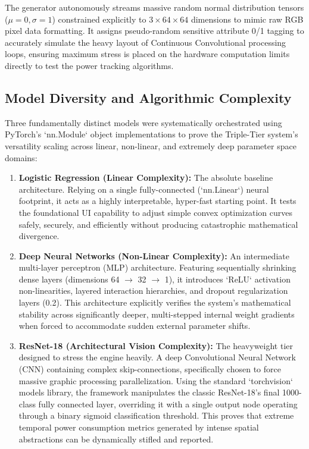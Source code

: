 \documentclass[12pt,a4paper]{article}
\begin{document}
The generator autonomously streams massive random normal distribution tensors ($\mu=0, \sigma=1$) constrained explicitly to $3 \times 64 \times 64$ dimensions to mimic raw RGB pixel data formatting. It assigns pseudo-random sensitive attribute 0/1 tagging to accurately simulate the heavy layout of Continuous Convolutional processing loops, ensuring maximum stress is placed on the hardware computation limits directly to test the power tracking algorithms.

\subsection{Model Diversity and Algorithmic Complexity}
Three fundamentally distinct models were systematically orchestrated using PyTorch's `nn.Module` object implementations to prove the Triple-Tier system’s versatility scaling across linear, non-linear, and extremely deep parameter space domains:
\begin{enumerate}
    \item \textbf{Logistic Regression (Linear Complexity):} The absolute baseline architecture. Relying on a single fully-connected (`nn.Linear`) neural footprint, it acts as a highly interpretable, hyper-fast starting point. It tests the foundational UI capability to adjust simple convex optimization curves safely, securely, and efficiently without producing catastrophic mathematical divergence.
    \item \textbf{Deep Neural Networks (Non-Linear Complexity):} An intermediate multi-layer perceptron (MLP) architecture. Featuring sequentially shrinking dense layers (dimensions 64 $\rightarrow$ 32 $\rightarrow$ 1), it introduces `ReLU` activation non-linearities, layered interaction hierarchies, and dropout regularization layers (0.2). This architecture explicitly verifies the system's mathematical stability across significantly deeper, multi-stepped internal weight gradients when forced to accommodate sudden external parameter shifts.
    \item \textbf{ResNet-18 (Architectural Vision Complexity):} The heavyweight tier designed to stress the engine heavily. A deep Convolutional Neural Network (CNN) containing complex skip-connections, specifically chosen to force massive graphic processing parallelization. Using the standard `torchvision` models library, the framework manipulates the classic ResNet-18’s final 1000-class fully connected layer, overriding it with a single output node operating through a binary sigmoid classification threshold. This proves that extreme temporal power consumption metrics generated by intense spatial abstractions can be dynamically stifled and reported.
\end{enumerate}
\end{document}
